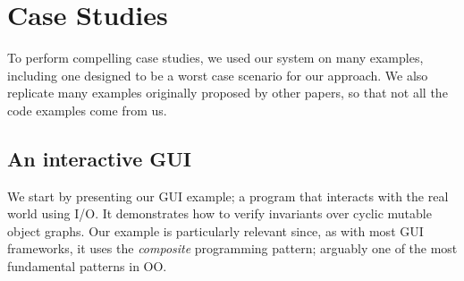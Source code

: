 \SS\section{Case Studies} %
\label{s:case-studyAll}
To perform compelling case studies, we used our system on many examples, including one designed to be a worst case scenario for our approach. We also replicate many examples originally proposed by other papers, so that 
not all the code examples come from us. 

\subsection{An interactive GUI}
\label{s:case-study}
We start by presenting our GUI example; a program that interacts with the real world using I/O.
It demonstrates how to verify invariants over cyclic mutable object graphs.
Our example is particularly relevant since, as with most GUI frameworks, it uses the \emph{composite} programming pattern; arguably one of the most fundamental patterns in OO.

